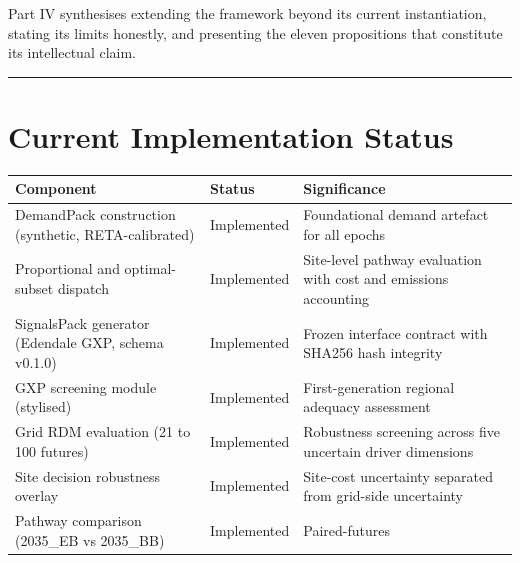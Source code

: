 \documentclass[
  11pt,
  a4paper,
  twoside,
  openright]{scrbook}
\newcounter{none} %
\begin{document}
Part IV synthesises extending the framework beyond its current
instantiation, stating its limits honestly, and presenting the eleven
propositions that constitute its intellectual claim.

\begin{center}\rule{0.5\linewidth}{0.5pt}\end{center}

\section{Current Implementation
Status}\label{current-implementation-status}

{\def\LTcaptype{none} %
\begin{longtable}[]{@{}
  >{\raggedright\arraybackslash}p{}
  >{\raggedright\arraybackslash}p{}
  >{\raggedright\arraybackslash}p{}@{}}
\toprule\noalign{}
\begin{minipage}[b]{\linewidth}\raggedright
Component
\end{minipage} & \begin{minipage}[b]{\linewidth}\raggedright
Status
\end{minipage} & \begin{minipage}[b]{\linewidth}\raggedright
Significance
\end{minipage} \\
\midrule\noalign{}
\endhead
\bottomrule\noalign{}
\endlastfoot
DemandPack construction (synthetic, RETA-calibrated) & Implemented &
Foundational demand artefact for all epochs \\
Proportional and optimal-subset dispatch & Implemented & Site-level
pathway evaluation with cost and emissions accounting \\
SignalsPack generator (Edendale GXP, schema v0.1.0) & Implemented &
Frozen interface contract with SHA256 hash integrity \\
GXP screening module (stylised) & Implemented & First-generation
regional adequacy assessment \\
Grid RDM evaluation (21 to 100 futures) & Implemented & Robustness
screening across five uncertain driver dimensions \\
Site decision robustness overlay & Implemented & Site-cost uncertainty
separated from grid-side uncertainty \\
Pathway comparison (2035\_EB vs 2035\_BB) & Implemented & Paired-futures

\end{longtable}}
\end{document}
